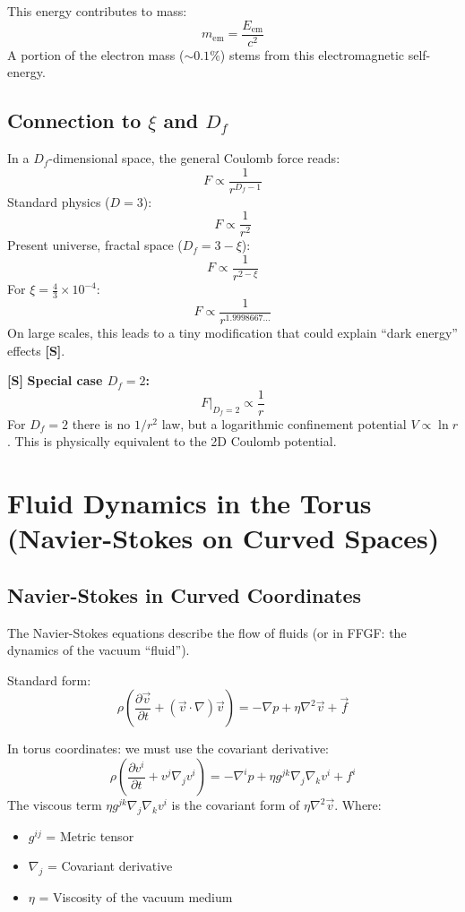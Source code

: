 This energy contributes to mass:
\[
m_{\text{em}} = \frac{E_{\text{em}}}{c^2}
\]
A portion of the electron mass (\( \sim 0.1\% \)) stems from this electromagnetic self-energy.

\subsection{Connection to \( \xi \) and \( D_f \)}
In a \(D_f\)-dimensional space, the general Coulomb force reads:
\[
F \propto \frac{1}{r^{D_f - 1}}
\]
Standard physics (\( D = 3 \)):
\[
F \propto \frac{1}{r^2}
\]
Present universe, fractal space (\( D_f = 3 - \xi \)):
\[
F \propto \frac{1}{r^{2 - \xi}}
\]
For \( \xi = \frac{4}{3} \times 10^{-4} \):
\[
F \propto \frac{1}{r^{1.9998667\ldots}}
\]
On large scales, this leads to a tiny modification that could explain ``dark energy'' effects \textbf{[S]}.

\textbf{[S]} \textbf{Special case \(D_f = 2\):}
\[
F\big|_{D_f=2} \propto \frac{1}{r}
\]
For $D_f = 2$ there is no \(1/r^2\) law, but a logarithmic confinement potential $V \propto \ln r$. This is physically equivalent to the 2D Coulomb potential.

\section{Fluid Dynamics in the Torus (Navier-Stokes on Curved Spaces)}
\subsection{Navier-Stokes in Curved Coordinates}
The Navier-Stokes equations describe the flow of fluids (or in FFGF: the dynamics of the vacuum ``fluid'').

Standard form:
\[
\rho\left(\frac{\partial \vec{v}}{\partial t} + (\vec{v} \cdot \nabla) \vec{v}\right) = -\nabla p + \eta \nabla^2 \vec{v} + \vec{f}
\]

In torus coordinates: we must use the covariant derivative:
\[
\rho\left(\frac{\partial v^i}{\partial t} + v^j \nabla_j v^i\right) = -\nabla^i p + \eta g^{jk} \nabla_j \nabla_k v^i + f^i
\]
The viscous term $\eta g^{jk}\nabla_j\nabla_k v^i$ is the covariant form of $\eta\nabla^2\vec{v}$.
Where:
\begin{itemize}
	\item \( g^{ij} \) = Metric tensor
	\item \( \nabla_j \) = Covariant derivative
	\item \( \eta \) = Viscosity of the vacuum medium
\end{itemize}

